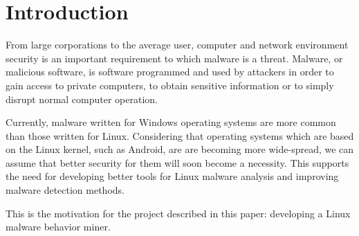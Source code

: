 \chapter{Introduction}
\label{chapter:intro}

From large corporations to the average user, computer and network environment security is an important requirement to which malware is a threat. Malware, or malicious software, is software programmed and used by attackers in order to gain access to private computers, to obtain sensitive information or to simply disrupt normal computer operation.

Currently, malware written for Windows operating systems are more common than those written for Linux. Considering that operating systems which are based on the Linux kernel, such as Android, are are becoming more wide-spread, we can assume that better security for them will soon become a necessity. This supports the need for developing better tools for Linux malware analysis and improving malware detection methods.

This is the motivation for the project described in this paper: developing a Linux malware behavior miner. 
